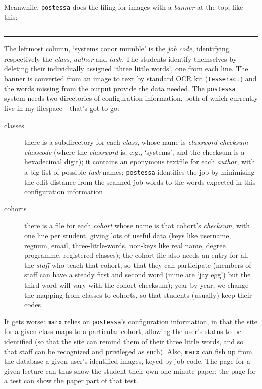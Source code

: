\documentclass{article}
\begin{document}
Meanwhile, {\tt postessa} does the filing for images with a \emph{banner} at the top, like this:

\noindent\hspace*{-0.8in}\rule{7in}{0.4pt}

\vspace*{1.6in}
\noindent\hspace*{-0.8in}\rule{7in}{0.4pt}

The leftmost column, `systems conor mumble' is the \emph{job code}, identifying respectively the \emph{class}, \emph{author} and \emph{task}. The students identify themselves by deleting their individually assigned `three little words', one from each line. The banner is converted from an image to text by standard OCR kit ({\tt tesseract}) and the words missing from the output provide the data needed. The {\tt postessa} system needs two directories of configuration information, both of which currently live in my filespace---that's got to go:
\begin{description}
\item[classes] there is a subdirectory for each \emph{class}, whose name is \emph{classword}-\emph{checksum}-\emph{classcode} (where the \emph{classword} is, e.g., `systems', and the checksum is a hexadecimal digit); it contains an eponymous textfile for each \emph{author}, with a big list of possible \emph{task} names; {\tt postessa} identifies the job by minimising the edit distance from the scanned job words to the words expected in this configuration information
\item[cohorts] there is a file for each \emph{cohort} whose name is that cohort's \emph{checksum}, with one line per student, giving lots of useful data (keys like username, regnum, email, three-little-words, non-keys like real name, degree programme, registered classes); the cohort file also needs an entry for all the \emph{staff} who teach that cohort, so that they can participate (members of staff can have a steady first and second word (mine are `jay egg') but the third word will vary with the cohort checksum); year by year, we change the mapping from classes to cohorts, so that students (usually) keep their codes
\end{description}

It gets worse: {\tt marx} relies on {\tt postessa}'s configuration information, in that the site for a given class maps to a particular cohort, allowing the user's status to be identified (so that the site can remind them of their three little words, and so that staff can be recognized and privileged as such). Also, {\tt marx} can fish up from the database a given user's identified images, keyed by job code. The page for a given lecture can thus show the student their own one minute paper; the page for a test can show the paper part of that test.
\end{document}
